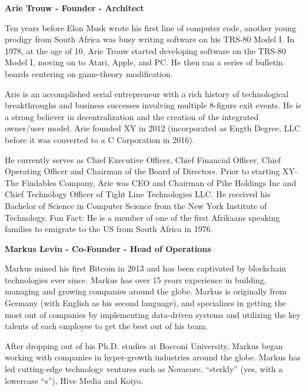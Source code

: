 \documentclass{article}
\begin{document}
\begin {framed}
\begin {center}
\textbf{Arie Trouw - Founder - Architect}\par
\end {center}
Ten years before Elon Musk wrote his first line of computer code, another young prodigy from South Africa was busy writing software on his TRS-80 Model I. In 1978, at the age of 10, Arie Trouw started developing software on the TRS-80 Model I, moving on to Atari, Apple, and PC. He then ran a series of bulletin boards centering on game-theory modification.

Arie is an accomplished serial entrepreneur with a rich history of technological breakthroughs and business successes involving multiple 8-figure exit events. He is a strong believer in decentralization and the creation of the integrated owner/user model. Arie founded XY in 2012 (incorporated as Ength Degree, LLC before it was converted to a C Corporation in 2016).

He currently serves as Chief Executive Officer, Chief Financial Officer, Chief Operating Officer and Chairman of the Board of Directors. Prior to starting XY-The Findables Company, Arie was CEO and Chairman of Pike Holdings Inc and Chief Technology Officer of Tight Line Technologies LLC. He received his Bachelor of Science in Computer Science from the New York Institute of Technology. Fun Fact: He is a member of one of the first Afrikaans speaking families to emigrate to the US from South Africa in 1976.

\end {framed}

\begin {framed}
\begin {center}
\textbf{Markus Levin - Co-Founder - Head of Operations}\par
\end {center}
Markus mined his first Bitcoin in 2013 and has been captivated by blockchain technologies ever since. Markus has over 15 years experience in building, managing and growing companies around the globe. Markus is originally from Germany (with English as his second language), and specializes in getting the most out of companies by implementing data-driven systems and utilizing the key talents of each employee to get the best out of his team.

After dropping out of his Ph.D. studies at Bocconi University, Markus began working with companies in hyper-growth industries around the globe. Markus has led cutting-edge technology ventures such as Novacore, ``sterkly'' (yes, with a lowercase ``s''), Hive Media and Koiyo.

\end {framed}
\end{document}
